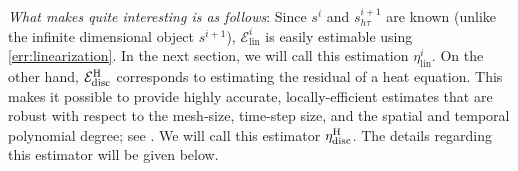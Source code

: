 \documentclass[review,11pt]{article}
\numberwithin{equation}{section}
\def \t  {\tau}
\def \calE {\mathcal{E}}
\def \calV {\mathcal{V}}
\def \calR {\mathcal{R}}
\def \calS {\mathcal{S}}
\newtheorem{theorem}[theorem]{Theorem}
\begin{document}

 

\textit{What makes  quite interesting is as follows}: Since $s^i$ and $s^{i+1}_{h\t}$ are known (unlike the infinite dimensional object $s^{i+1}$), $\calE_{\mathrm{lin}}^i$ is easily estimable using \eqref{err:linearization}. In the next section, we will call this estimation $\eta_{\mathrm{lin}}^i$. On the other hand,  $\calE_{\mathrm{disc}}^{\rm H}$ corresponds to estimating the residual of a heat equation. This makes it possible to provide highly accurate, locally-efficient estimates that are robust with respect to the mesh-size, time-step size, and the spatial and temporal polynomial degree; see \cite{ErnSmearsVohralik2017}. We will call this estimator $\eta_{\mathrm{disc}}^{\rm H}$. The details regarding this estimator will be given below.
\end{document}
